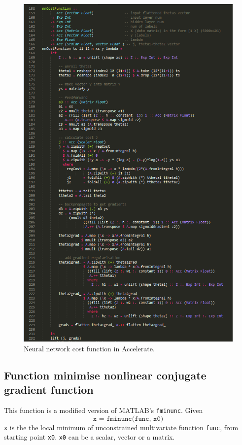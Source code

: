 \begin{figure}
	\centerline{\includegraphics[width=\linewidth]{nnCostFunction-acc.png}}
	\caption{Neural network cost function in Accelerate.}
	\label{fig:nnCostFunction.acc}
\end{figure}

\subsection{Function minimise nonlinear conjugate gradient function} \label{se:impl.fmincg}

This function is a modified version of MATLAB's \texttt{fminunc}. Given 
$$\texttt{x = fminunc(func, x0)}$$
\texttt{x} is the the local minimum of unconstrained multivariate function \texttt{func}, from starting point \texttt{x0}. \texttt{x0} can be a scalar, vector or a matrix.~\cite{Reb13}

